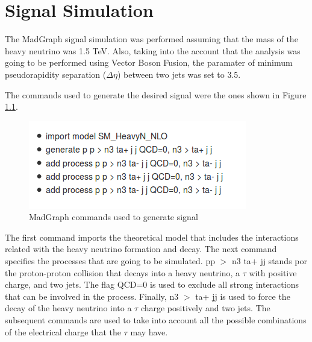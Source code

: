 \chapter{Signal Simulation} \label{sec: mgsim}

The MadGraph signal simulation was performed assuming that the mass of the heavy neutrino was 1.5 TeV. Also, taking into the account that the analysis was going to be performed using Vector Boson Fusion, the paramater of minimum pseudorapidity separation ($\Delta \eta$) between two jets was set to 3.5.

The commands used to generate the desired signal were the ones shown in Figure \ref{fig: mgCommands}.

\begin{figure}[H]
\centering
\includegraphics[scale = 1]{Figures/mg_commands}
\caption{MadGraph commands used to generate signal}
\label{fig: mgCommands}
\end{figure}

The first command imports the theoretical model that includes the interactions related with the heavy neutrino formation and decay. The next command specifies the processes that are going to be simulated. pp $>$ n3 ta+ jj stands por the proton-proton collision that decays into a heavy neutrino, a $\tau$ with positive charge, and two jets. The flag QCD=0 is used to exclude all strong interactions that can be involved in the process. Finally, n3 $>$ ta+ jj is used to force the decay of the heavy neutrino into a $\tau$ charge positively and two jets. The subsequent commands are used to take into account all the possible combinations of the electrical charge that the $\tau$ may have.

